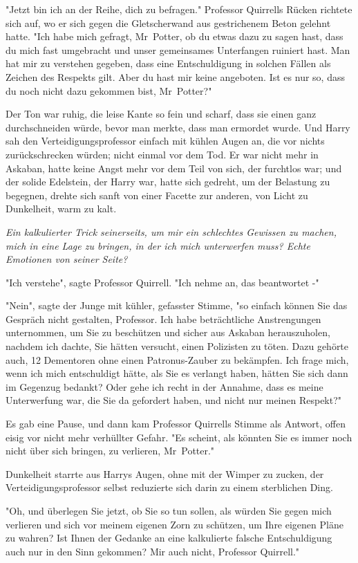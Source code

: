 {"Jetzt bin ich an der Reihe, dich zu befragen." Professor Quirrells Rücken richtete sich auf, wo er sich gegen die Gletscherwand aus gestrichenem Beton gelehnt hatte. "Ich habe mich gefragt, Mr~Potter, ob du etwas dazu zu sagen hast, dass du mich fast umgebracht und unser gemeinsames Unterfangen ruiniert hast. Man hat mir zu verstehen gegeben, dass eine Entschuldigung in solchen Fällen als Zeichen des Respekts gilt. Aber du hast mir keine angeboten. Ist es nur so, dass du noch nicht dazu gekommen bist, Mr~Potter?"

Der Ton war ruhig, die leise Kante so fein und scharf, dass sie einen ganz durchschneiden würde, bevor man merkte, dass man ermordet wurde. Und Harry sah den Verteidigungsprofessor einfach mit kühlen Augen an, die vor nichts zurückschrecken würden; nicht einmal vor dem Tod. Er war nicht mehr in Askaban, hatte keine Angst mehr vor dem Teil von sich, der furchtlos war; und der solide Edelstein, der Harry war, hatte sich gedreht, um der Belastung zu begegnen, drehte sich sanft von einer Facette zur anderen, von Licht zu Dunkelheit, warm zu kalt.

\emph{Ein kalkulierter Trick seinerseits, um mir ein schlechtes Gewissen zu machen, mich in eine Lage zu bringen, in der ich mich unterwerfen muss? Echte Emotionen von seiner Seite?}

"Ich verstehe", sagte Professor Quirrell. "Ich nehme an, das beantwortet -"

"Nein", sagte der Junge mit kühler, gefasster Stimme, "so einfach können Sie das Gespräch nicht gestalten, Professor. Ich habe beträchtliche Anstrengungen unternommen, um Sie zu beschützen und sicher aus Askaban herauszuholen, nachdem ich dachte, Sie hätten versucht, einen Polizisten zu töten. Dazu gehörte auch, 12 Dementoren ohne einen Patronus-Zauber zu bekämpfen. Ich frage mich, wenn ich mich entschuldigt hätte, als Sie es verlangt haben, hätten Sie sich dann im Gegenzug bedankt? Oder gehe ich recht in der Annahme, dass es meine Unterwerfung war, die Sie da gefordert haben, und nicht nur meinen Respekt?"

Es gab eine Pause, und dann kam Professor Quirrells Stimme als Antwort, offen eisig vor nicht mehr verhüllter Gefahr. "Es scheint, als könnten Sie es immer noch nicht über sich bringen, zu verlieren, Mr~Potter."

Dunkelheit starrte aus Harrys Augen, ohne mit der Wimper zu zucken, der Verteidigungsprofessor selbst reduzierte sich darin zu einem sterblichen Ding.

"Oh, und überlegen Sie jetzt, ob Sie so tun sollen, als würden Sie gegen mich verlieren und sich vor meinem eigenen Zorn zu schützen, um Ihre eigenen Pläne zu wahren? Ist Ihnen der Gedanke an eine kalkulierte falsche Entschuldigung auch nur in den Sinn gekommen? Mir auch nicht, Professor Quirrell."

}
